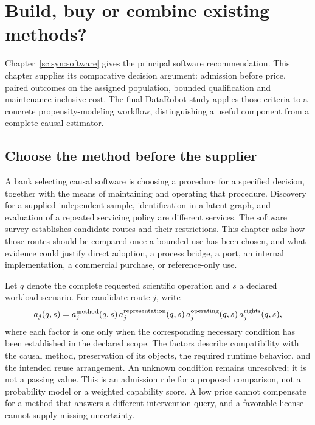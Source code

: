 \chapter{Build, buy or combine existing methods?}
\label{exec16:s10}

Chapter~\ref{scisyn:software} gives the principal software recommendation.
This chapter supplies its comparative decision argument: admission before
price, paired outcomes on the assigned population, bounded qualification and
maintenance-inclusive cost. The final DataRobot study applies those criteria
to a concrete propensity-modeling workflow, distinguishing a useful component
from a complete causal estimator.

\section{Choose the method before the supplier}

A bank selecting causal software is choosing a procedure for a specified
decision, together with the means of maintaining and operating that procedure.
Discovery for a supplied independent sample, identification in a latent graph,
and evaluation of a repeated servicing policy are different services. The
software survey establishes candidate routes and their restrictions. This
chapter asks how those routes should be compared once a bounded use has been
chosen, and what evidence could justify direct adoption, a process bridge, a
port, an internal implementation, a commercial purchase, or reference-only use.

Let \(q\) denote the complete requested scientific operation and \(s\) a
declared workload scenario. For candidate route \(j\), write
\[
 a_j(q,s)=a_j^{\rm method}(q,s)\,a_j^{\rm representation}(q,s)
          \,a_j^{\rm operating}(q,s)\,a_j^{\rm rights}(q,s),
\]
where each factor is one only when the corresponding necessary condition has
been established in the declared scope. The factors describe compatibility
with the causal method, preservation of its objects, the required runtime
behavior, and the intended reuse arrangement. An unknown condition remains
unresolved; it is not a passing value. This is an admission rule for a proposed
comparison, not a probability model or a weighted capability score. A low
price cannot compensate for a method that answers a different intervention
query, and a favorable license cannot supply missing uncertainty.
\citep{exec16_s10_design}

